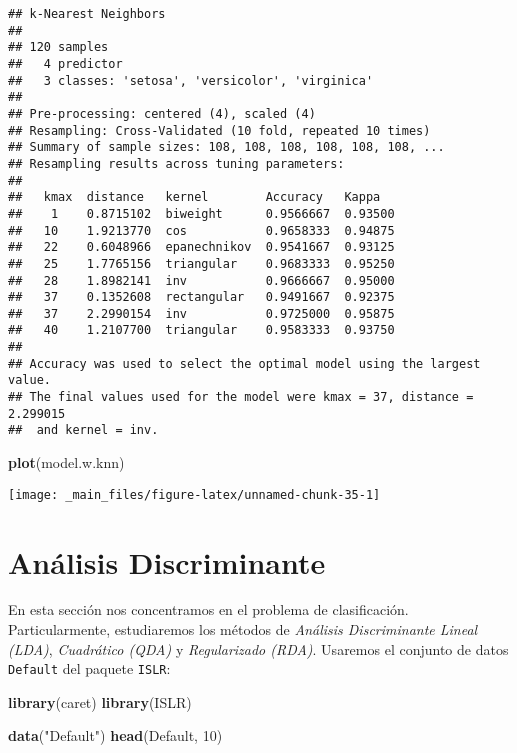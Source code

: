 \documentclass[]{book}
\newenvironment{Shaded}{\begin{snugshade}}{\end{snugshade}}
\newcommand{\DecValTok}[1]{\textcolor[rgb]{0.00,0.00,0.81}{#1}}
\newcommand{\KeywordTok}[1]{\textcolor[rgb]{0.13,0.29,0.53}{\textbf{#1}}}
\newcommand{\NormalTok}[1]{#1}
\newcommand{\StringTok}[1]{\textcolor[rgb]{0.31,0.60,0.02}{#1}}
\begin{document}
\begin{verbatim}
## k-Nearest Neighbors 
## 
## 120 samples
##   4 predictor
##   3 classes: 'setosa', 'versicolor', 'virginica' 
## 
## Pre-processing: centered (4), scaled (4) 
## Resampling: Cross-Validated (10 fold, repeated 10 times) 
## Summary of sample sizes: 108, 108, 108, 108, 108, 108, ... 
## Resampling results across tuning parameters:
## 
##   kmax  distance   kernel        Accuracy   Kappa  
##    1    0.8715102  biweight      0.9566667  0.93500
##   10    1.9213770  cos           0.9658333  0.94875
##   22    0.6048966  epanechnikov  0.9541667  0.93125
##   25    1.7765156  triangular    0.9683333  0.95250
##   28    1.8982141  inv           0.9666667  0.95000
##   37    0.1352608  rectangular   0.9491667  0.92375
##   37    2.2990154  inv           0.9725000  0.95875
##   40    1.2107700  triangular    0.9583333  0.93750
## 
## Accuracy was used to select the optimal model using the largest value.
## The final values used for the model were kmax = 37, distance = 2.299015
##  and kernel = inv.
\end{verbatim}

\begin{Shaded}
\begin{Highlighting}[]
\KeywordTok{plot}\NormalTok{(model.w.knn)}
\end{Highlighting}
\end{Shaded}

\begin{center}\texttt{[image: \_main\_files/figure-latex/unnamed-chunk-35-1]} \end{center}

\hypertarget{DA}{%
\chapter{Análisis Discriminante}\label{DA}}

En esta sección nos concentramos en el problema de clasificación. Particularmente, estudiaremos los métodos de \emph{Análisis Discriminante Lineal (LDA)}, \emph{Cuadrático (QDA)} y \emph{Regularizado (RDA)}. Usaremos el conjunto de datos \texttt{Default} del paquete \texttt{ISLR}:

\begin{Shaded}
\begin{Highlighting}[]
\KeywordTok{library}\NormalTok{(caret)}
\KeywordTok{library}\NormalTok{(ISLR)}

\KeywordTok{data}\NormalTok{(}\StringTok{"Default"}\NormalTok{)}
\KeywordTok{head}\NormalTok{(Default, }\DecValTok{10}\NormalTok{)}
\end{Highlighting}
\end{Shaded}
\end{document}
